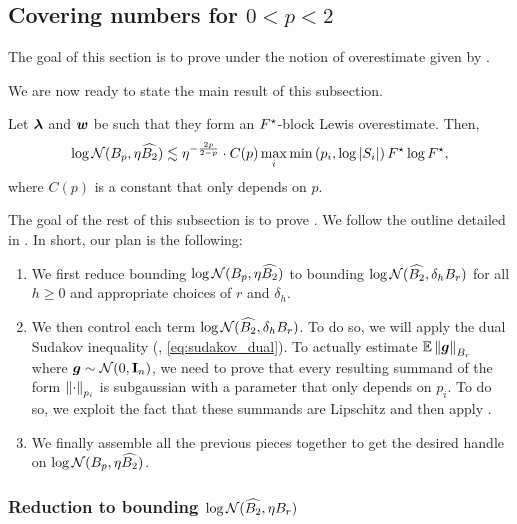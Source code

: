 \documentclass[11pt]{article}
\numberwithin{equation}{section}
\begin{document}
\subsection{Covering numbers for \texorpdfstring{$0 < p < 2$}{0 < p < 2}}

The goal of this section is to prove  under the notion of overestimate given by . 

We are now ready to state the main result of this subsection.

\begin{lemma}
\label{lemma:covering_two_to_one_clean}
Let $\bm{\lambda}$ and $\bm{w}$ be such that they form an $F^{\star}$-block Lewis overestimate. Then,
\begin{align*}
    \log\mathcal{N}(B_p,\eta \widehat{B_2}) \lesssim \eta^{-\frac{2p}{2-p}} \cdot C(p)\max_{i}\min\left(p_i,\log\left\lvert S_i \right\rvert\right)F^{\star}\log F^{\star},
\end{align*}
where $C(p)$ is a constant that only depends on $p$.
\end{lemma}

The goal of the rest of this subsection is to prove . We follow the outline detailed in . In short, our plan is the following:
\begin{enumerate}
    \item We first reduce bounding $\log\mathcal{N}(B_p, \eta\widehat{B_2})$ to bounding $\log\mathcal{N}(\widehat{B_2}, \delta_h B_r)$ for all $h \ge 0$ and appropriate choices of $r$ and $\delta_h$.
    \item We then control each term $\log\mathcal{N}(\widehat{B_2}, \delta_h B_r)$. To do so, we will apply the dual Sudakov inequality (, \eqref{eq:sudakov_dual}). To actually estimate $\mathbb{E}\left\lVert \bm{g} \right\rVert_{B_r}$ where $\bm{g} \sim \mathcal{N}(0,\mathbf{I}_n)$, we need to prove that every resulting summand of the form $\left\lVert \cdot \right\rVert_{p_i}$ is subgaussian with a parameter that only depends on $p_i$. To do so, we exploit the fact that these summands are Lipschitz and then apply .
    \item We finally assemble all the previous pieces together to get the desired handle on $\log\mathcal{N}(B_p, \eta\widehat{B_2})$. 
\end{enumerate}

\subsubsection{Reduction to bounding \texorpdfstring{$\log\mathcal{N}(\widehat{B_2},\eta B_r)$}{log N(\^{B2}, n Br)}}
\end{document}
